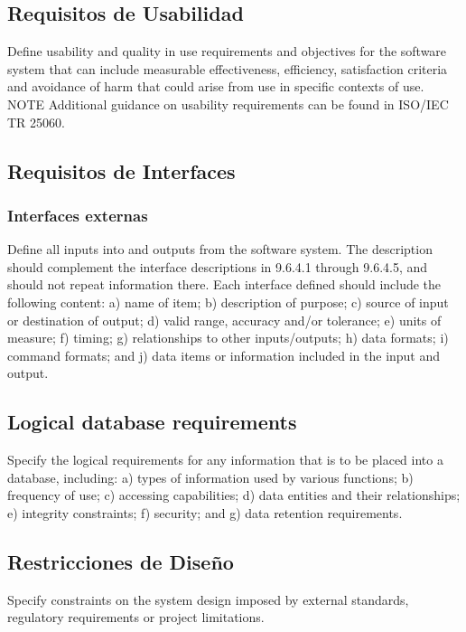 \documentclass[12pt, a4paper, twoside]{article}
\begin{document}
\subsection{Requisitos de Usabilidad}
Define usability and quality in use requirements and objectives for the software system that can include
measurable effectiveness, efficiency, satisfaction criteria and avoidance of harm that could arise from
use in specific contexts of use.
NOTE Additional guidance on usability requirements can be found in ISO/IEC TR 25060.

\subsection{Requisitos de Interfaces}

 \subsubsection{Interfaces externas}
 Define all inputs into and outputs from the software system. The description should complement the
 interface descriptions in 9.6.4.1 through 9.6.4.5, and should not repeat information there.
 Each interface defined should include the following content:
 a) name of item;
 b) description of purpose;
 c) source of input or destination of output;
 d) valid range, accuracy and/or tolerance;
 e) units of measure;
 f) timing;
 g) relationships to other inputs/outputs;
 h) data formats;
 i) command formats; and
 j) data items or information included in the input and output.

 \subsection{Logical database requirements}
 Specify the logical requirements for any information that is to be placed into a database, including:
 a) types of information used by various functions;
 b) frequency of use;
 c) accessing capabilities;
 d) data entities and their relationships;
 e) integrity constraints;
 f) security; and
 g) data retention requirements.

 \subsection{Restricciones de Diseño}
 Specify constraints on the system design imposed by external standards, regulatory requirements or
 project limitations.
\end{document}
